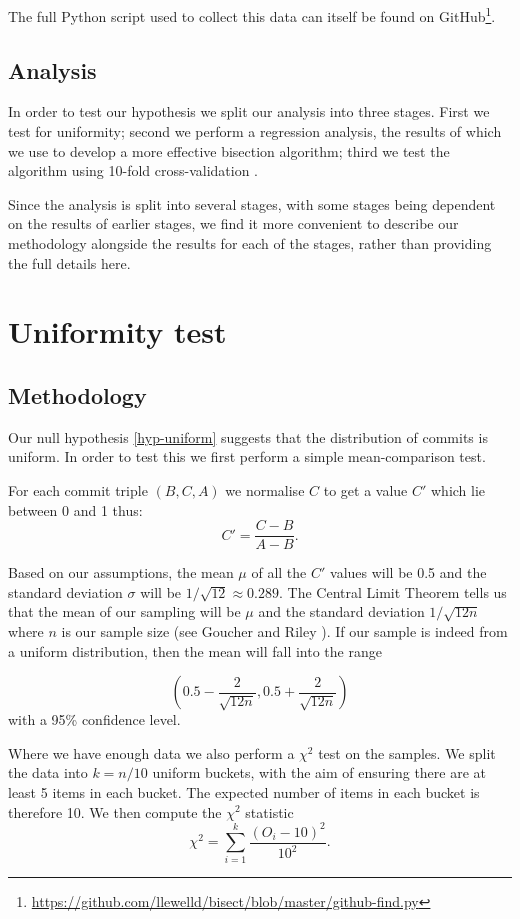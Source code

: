 \documentclass[10pt,journal,compsoc]{IEEEtran}
\begin{document}
The full Python script used to collect this data can itself be found on GitHub\footnote{\url{https://github.com/llewelld/bisect/blob/master/github-find.py}}.

\subsection{Analysis}

In order to test our hypothesis we split our analysis into three stages. First we test for uniformity; second we perform a regression analysis, the results of which we use to develop a more effective bisection algorithm; third we test the algorithm using 10-fold cross-validation \cite{}.

Since the analysis is split into several stages, with some stages being dependent on the results of earlier stages, we find it more convenient to describe our methodology alongside the results for each of the stages, rather than providing the full details here.

\section{Uniformity test}
\label{section-uniformity}

\subsection{Methodology}

Our null hypothesis \ref{hyp-uniform} suggests that the distribution of commits is uniform. In order to test this we first perform a simple mean-comparison test.

For each commit triple $(B, C, A)$ we normalise $C$ to get a value $C'$ which lie between 0 and 1 thus:
$$
C' = \frac{C - B}{A - B} .
$$

Based on our assumptions, the mean $\mu$ of all the $C'$ values will be 0.5 and the standard deviation $\sigma$ will be $1 / \sqrt{12} \approx 0.289$. The Central Limit Theorem tells us that the mean of our sampling will be $\mu$ and the standard deviation $1 / \sqrt{12 n}$ where $n$ is our sample size (see Goucher and Riley \cite{goucher2009}). If our sample is indeed from a uniform distribution, then the mean will fall into the range

$$
\left( 0.5 - \frac{2}{\sqrt{12 n}}, 0.5 + \frac{2}{\sqrt{12 n}} \right)
$$
with a 95\% confidence level.

Where we have enough data we also perform a $\chi^2$ test on the samples. We split the data into $k = n / 10$ uniform buckets, with the aim of ensuring there are at least 5 items in each bucket. The expected number of items in each bucket is therefore 10. We then compute the $\chi^2$ statistic \cite{knuth2014}
$$
\chi^2 = \sum_{i = 1}^k \frac{(O_i - 10)^2}{10^2} .
$$
\end{document}
